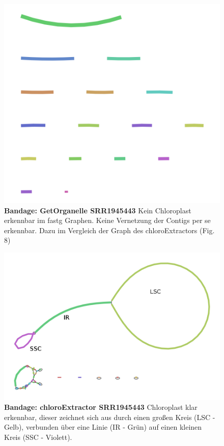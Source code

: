 \documentclass{scrartcl}
\begin{document}
\begin{figure}
\includegraphics[width=.9\linewidth]{./graph_GO_SRR1945443.png}
\caption[Bandage: GetOrganelle SRR1945443]{\textbf{Bandage: GetOrganelle SRR1945443} Kein Chloroplast erkennbar im fastg Graphen. Keine Vernetzung der Contigs per se erkennbar. Dazu im Vergleich der Graph des chloroExtractors (Fig. 8)}
\end{figure}
\begin{figure}
\includegraphics[width=.9\linewidth]{./graph_CE_SRR1945443_1.png}
\caption[Bandage: chloroExtractor SRR1945443]{\textbf{Bandage: chloroExtractor SRR1945443} Chloroplast klar erkennbar, dieser zeichnet sich aus durch einen großen Kreis (LSC - Gelb), verbunden über eine Linie (IR - Grün) auf einen kleinen Kreis (SSC - Violett). }
\end{figure}
\end{document}
